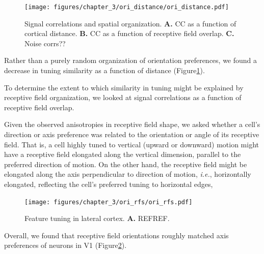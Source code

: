 \begin{figure}[t!]
    \texttt{[image: figures/chapter\_3/ori\_distance/ori\_distance.pdf]}
    \vspace{.1in}
    \caption[Organization of tuning similarity]{Signal correlations and spatial organization. \textbf{A.} CC as a function of cortical distance. \textbf{B.} CC as a function of receptive field overlap. \textbf{C.} Noise corrs??
    \label{fig:ori_distance}}
\end{figure}

Rather than a purely random organization of orientation preferences, we found a decrease in tuning similarity as a function of distance (Figure\ref{fig:ori_distance}). 

To determine the extent to which similarity in tuning might be explained by receptive field organization, we looked at signal correlations as a function of receptive field overlap. 

Given the observed anisotropies in receptive field shape, we asked whether a cell's direction or axis preference was related to the orientation or angle of its receptive field. That is, a cell highly tuned to vertical (upward or downward) motion might have a receptive field elongated along the vertical dimension, parallel to the preferred direction of motion. On the other hand, the receptive field might be elongated along the axis perpendicular to direction of motion, \textit{i.e.}, horizontally elongated, reflecting the cell's preferred tuning to horizontal edges, 

\begin{figure}[t!]
    \texttt{[image: figures/chapter\_3/ori\_rfs/ori\_rfs.pdf]}
    \vspace{.1in}
    \caption[Receptive field shape and edge tuning]{Feature tuning in lateral cortex. \textbf{A.} REFREF.
    \label{fig:ori_rfs}}
\end{figure}

Overall, we found that receptive field orientations roughly matched axis preferences of neurons in V1 (Figure\ref{fig:ori_rfs}). 

